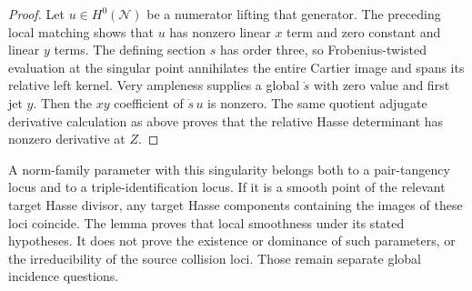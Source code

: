 \begin{proof}
Let $u\in H^0(\mathcal N)$ be a numerator lifting that generator.
The preceding local matching shows that $u$ has nonzero linear
$x$ term and zero constant and linear $y$ terms. The defining
section $s$ has order three, so Frobenius-twisted evaluation at
the singular point annihilates the entire Cartier image and
spans its relative left kernel. Very ampleness supplies a global
$\dot s$ with zero value and first jet $y$. Then the $xy$
coefficient of $\dot s\,u$ is nonzero. The same quotient
adjugate derivative calculation as above proves that the relative
Hasse determinant has nonzero derivative at $Z$.
\end{proof}

\begin{remark}
A norm-family parameter with this singularity belongs both to a
pair-tangency locus and to a triple-identification locus. If it is
a smooth point of the relevant target Hasse divisor, any target
Hasse components containing the images of these loci coincide.
The lemma proves that local smoothness under its stated hypotheses.
It does not prove the existence or dominance of such parameters,
or the irreducibility of the source collision loci. Those remain
separate global incidence questions.
\end{remark}

